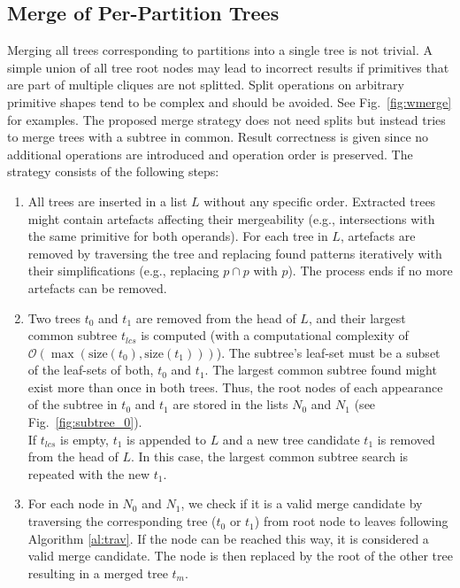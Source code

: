 \subsection{Merge of Per-Partition Trees}
\label{sec:merge}
Merging all trees corresponding to partitions into a single tree is not trivial. 
A simple union of all tree root nodes may lead to incorrect results if primitives that are part of multiple cliques are not splitted.
Split operations on arbitrary primitive shapes tend to be complex and should be avoided.
See Fig.~\ref{fig:wmerge} for examples.  
The proposed merge strategy does not need splits but instead tries to merge trees with a subtree in common.
Result correctness is given since no additional operations are introduced and operation order is preserved.
The strategy consists of the following steps:
\begin{enumerate}
	\item All trees are inserted in a list $L$ without any specific order.   
	Extracted trees might contain artefacts affecting their mergeability (e.g., intersections with the same primitive for both operands). 
	For each tree in $L$, artefacts are removed by traversing the tree and replacing found patterns iteratively with their simplifications 
(e.g., replacing $p \cap p$ with $p$).
	The process ends if no more artefacts can be removed.  
	\item Two trees $t_0$ and $t_1$ are removed from the head of $L$, and their largest common subtree $t_{lcs}$ is computed (with a computational complexity of $\mathcal{O}(\max(\text{size}(t_0),\text{size}(t_1)))$).
	The subtree's leaf-set must be a subset of the leaf-sets of both, $t_0$ and $t_1$. 
	The largest common subtree found might exist more than once in both trees.
	Thus, the root nodes of each appearance of the subtree in $t_0$ and $t_1$ are stored in the lists $N_0$ and $N_1$ (see Fig.~\ref{fig:subtree_0}).
	\\	
	If $t_{lcs}$ is empty, $t_1$ is appended to $L$ and a new tree candidate $t_1$ is removed from the head of $L$. 
	In this case, the largest common subtree search is repeated with the new $t_1$.
	\item For each node in $N_0$ and $N_1$, we check if it is a valid merge candidate by traversing the corresponding tree ($t_0$ or $t_1$) from root node to leaves following Algorithm \ref{al:trav}.
	If the node can be reached this way, it is considered a valid merge candidate.
	The node is then replaced by the root of the other tree resulting in a merged tree $t_m$.

\end{enumerate}
